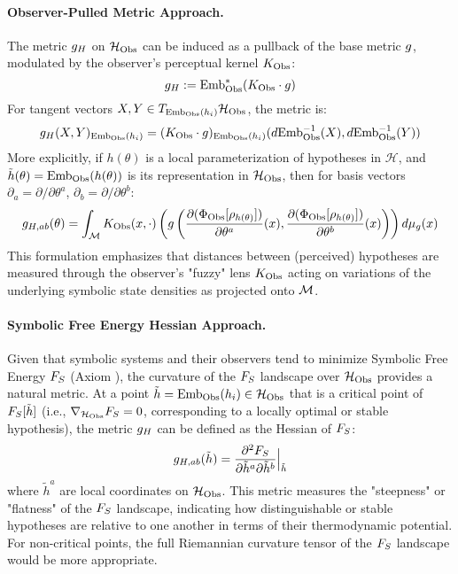 \paragraph{Observer-Pulled Metric Approach.}
The metric \(g_H\) on \(\mathcal{H}_{\mathrm{Obs}}\) can be induced as a pullback of the base metric \(g\), modulated by the observer's perceptual kernel \(K_{\mathrm{Obs}}\):
\begin{equation}
g_H := \text{Emb}_{\mathrm{Obs}}^*(K_{\mathrm{Obs}} \cdot g)
\end{equation}
For tangent vectors \(X, Y \in T_{\text{Emb}_{\mathrm{Obs}}(h_i)}\mathcal{H}_{\mathrm{Obs}}\), the metric is:
\begin{equation}
g_H(X, Y)_{\text{Emb}_{\mathrm{Obs}}(h_i)} = (K_{\mathrm{Obs}} \cdot g)_{\text{Emb}_{\mathrm{Obs}}(h_i)}(d\text{Emb}_{\mathrm{Obs}}^{-1}(X), d\text{Emb}_{\mathrm{Obs}}^{-1}(Y))
\end{equation}
More explicitly, if \(h(\theta)\) is a local parameterization of hypotheses in \(\mathcal{H}\), and \(\tilde{h}(\theta) = \text{Emb}_{\mathrm{Obs}}(h(\theta))\) is its representation in \(\mathcal{H}_{\mathrm{Obs}}\), then for basis vectors \(\partial_a = \partial/\partial\theta^a\), \(\partial_b = \partial/\partial\theta^b\):
\begin{equation}
g_{H,ab}(\theta) = \int_{\mathcal{M}} K_{\mathrm{Obs}}(x, \cdot) \left( g\left( \frac{\partial (\Phi_{\mathrm{Obs}}[\rho_{h(\theta)}])}{\partial \theta^a}(x), \frac{\partial (\Phi_{\mathrm{Obs}}[\rho_{h(\theta)}])}{\partial \theta^b}(x) \right) \right) d\mu_{g}(x)
\end{equation}
This formulation emphasizes that distances between (perceived) hypotheses are measured through the observer's "fuzzy" lens \(K_{\mathrm{Obs}}\) acting on variations of the underlying symbolic state densities as projected onto \(\mathcal{M}\).
\paragraph{Symbolic Free Energy Hessian Approach.}
Given that symbolic systems and their observers tend to minimize Symbolic Free Energy \(F_S\) (Axiom ), the curvature of the \(F_S\) landscape over \(\mathcal{H}_{\mathrm{Obs}}\) provides a natural metric. At a point \(\tilde{h} = \text{Emb}_{\mathrm{Obs}}(h_i) \in \mathcal{H}_{\mathrm{Obs}}\) that is a critical point of \(F_S[\tilde{h}]\) (i.e., \(\nabla_{\mathcal{H}_{\mathrm{Obs}}}F_S = 0\), corresponding to a locally optimal or stable hypothesis), the metric \(g_H\) can be defined as the Hessian of \(F_S\):
\begin{equation}
g_{H,ab}(\tilde{h}) = \frac{\partial^2 F_S}{\partial \tilde{h}^a \partial \tilde{h}^b} \Big|_{\tilde{h}}
\end{equation}
where \(\tilde{h}^a\) are local coordinates on \(\mathcal{H}_{\mathrm{Obs}}\). This metric measures the "steepness" or "flatness" of the \(F_S\) landscape, indicating how distinguishable or stable hypotheses are relative to one another in terms of their thermodynamic potential. For non-critical points, the full Riemannian curvature tensor of the \(F_S\) landscape would be more appropriate.
